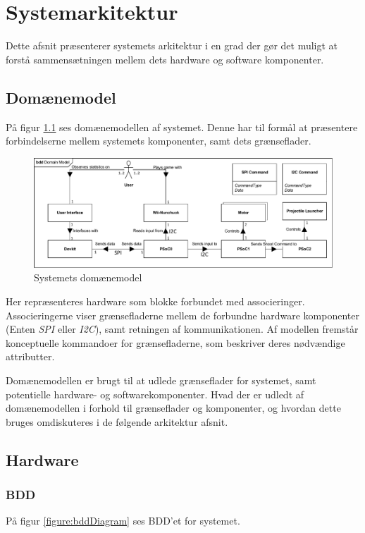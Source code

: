 \chapter{Systemarkitektur}

Dette afsnit præsenterer systemets arkitektur i en grad der gør det muligt at forstå sammensætningen mellem dets hardware og software komponenter.

\section{Domænemodel}

På figur \ref{figure:domainModel} ses domænemodellen af systemet. Denne har til formål at præsentere forbindelserne mellem systemets komponenter, samt dets grænseflader.

\begin{figure}[H]
	\centering
	\includegraphics[width=\textwidth]{SystemArkitektur/images/domainModel}
	\caption{Systemets domænemodel}
	\label{figure:domainModel}
\end{figure}

Her repræsenteres hardware som blokke forbundet med associeringer. Associeringerne viser grænsefladerne mellem de forbundne hardware komponenter (Enten \textit{SPI} eller \textit{I2C}), samt retningen af kommunikationen. Af modellen fremstår konceptuelle kommandoer for grænsefladerne, som beskriver deres nødvændige attributter.

Domænemodellen er brugt til at udlede grænseflader for systemet, samt potentielle hardware- og softwarekomponenter. Hvad der er udledt af domænemodellen i forhold til grænseflader og komponenter, og hvordan dette bruges omdiskuteres i de følgende arkitektur afsnit.

\section{Hardware}

\subsection{BDD}
\label{afsnit:BDD}
På figur \ref{figure:bddDiagram} ses BDD'et for systemet.

